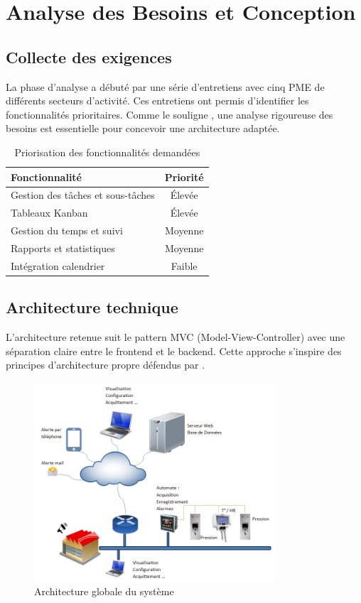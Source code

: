 \chapter{Analyse des Besoins et Conception}

\section{Collecte des exigences}
La phase d'analyse a débuté par une série d'entretiens avec cinq PME de différents secteurs d'activité. Ces entretiens ont permis d'identifier les fonctionnalités prioritaires. Comme le souligne \cite{martin2017clean}, une analyse rigoureuse des besoins est essentielle pour concevoir une architecture adaptée.

\begin{table}[H]
	\centering
	\caption{Priorisation des fonctionnalités demandées}
	\begin{tabular}{p{8cm}c}
		\toprule
		\textbf{Fonctionnalité} & \textbf{Priorité}\\
		\midrule
		Gestion des tâches et sous-tâches & Élevée \\
		Tableaux Kanban & Élevée \\
		Gestion du temps et suivi & Moyenne \\
		Rapports et statistiques & Moyenne \\
		Intégration calendrier & Faible \\
		\bottomrule
	\end{tabular}
\end{table}

\section{Architecture technique}
L'architecture retenue suit le pattern MVC (Model-View-Controller) avec une séparation claire entre le frontend et le backend. Cette approche s'inspire des principes d'architecture propre défendus par \cite{martin2017clean}.

\begin{figure}[H]
	\centering
	\includegraphics[width=0.8\textwidth]{images/architecture.png}
	\caption{Architecture globale du système}
	\label{fig:architecture}
\end{figure}

